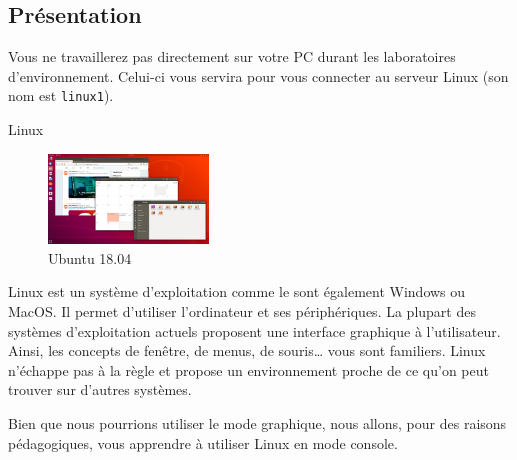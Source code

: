 \documentclass[a4paper,11pt]{style-esi/td}
\begin{document}

	\subsection{Présentation}

		Vous ne travaillerez pas directement sur votre PC durant les laboratoires d'environnement. 
		Celui-ci vous servira pour vous connecter au serveur Linux
		(son nom est \verb_linux1_).

		\begin{theorie}{Linux}
			\begin{figure} 
				\vspace{-1em}
				\flushright
				\includegraphics[width=0.38\textwidth]{images/ubuntu}
				\caption{Ubuntu 18.04}
				\vspace{-1em}
			\end{figure} 
			Linux est un système d'exploitation comme le sont également Windows ou MacOS. 
			Il permet d'utiliser l'ordinateur et ses périphériques. 
			La plupart des systèmes d'exploitation actuels proposent 
			une interface graphique à l'utilisateur. 
			Ainsi, les concepts de fenêtre, de menus, de souris\dots{} vous sont familiers. 
			Linux n'échappe pas à la règle et propose un environnement 
			proche de ce qu'on peut trouver sur d'autres systèmes.
		\end{theorie}

		Bien que nous pourrions utiliser le mode graphique, 
		nous allons, pour des raisons pédagogiques, 
		vous apprendre à utiliser Linux en mode console.
\end{document}
